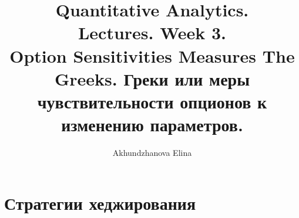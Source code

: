\documentclass{article}
\title{Quantitative Analytics.\\
Lectures. Week 3. \\
Option Sensitivities Measures The Greeks. Греки или меры чувствительности опционов к изменению параметров.}
\author{Akhundzhanova Elina}
\begin{document}
\maketitle

\setcounter{tocdepth}{2} %
\renewcommand\contentsname{Содержание}
\tableofcontents
\newpage




\renewcommand{\labelitemi}{\tiny$\bullet$}
\renewcommand{\figurename}{Рис.}

 \section{Стратегии хеджирования}
\end{document}
